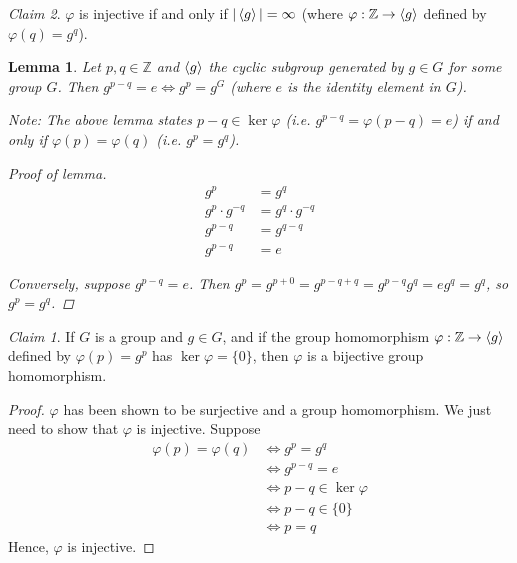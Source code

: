 \documentclass[12pt,letterpaper,DIV=11,final]{scrartcl}
\theoremstyle{plain}
\newtheorem{lemma}[theorem]{Lemma}
\theoremstyle{definition}
\theoremstyle{remark}
\newtheorem{claim}{Claim}
\begin{document}
\begin{claim}
  $\varphi$ is injective if and only if $|\braket{g}| = \infty$ (where $\varphi : \mathbb{Z} \to \braket{g}$ defined by $\varphi(q) = g^q$).

  \begin{lemma}
    Let $p, q \in \mathbb{Z}$ and $\braket{g}$ the cyclic subgroup generated by $g \in G$ for some group $G$.
    Then $g^{p - q} = e \iff g^p = g^G$ (where $e$ is the identity element in $G$).

    Note: The above lemma states $p - q \in \ker \varphi$ (i.e. $g^{p - q} = \varphi(p - q) = e$) if and only if $\varphi(p) = \varphi(q)$ (i.e. $g^p = g^q$).

    \begin{proof}[Proof of lemma]
      \begin{align*}
        g^p              &= g^q \\
        g^p \cdot g^{-q} &= g^q \cdot g^{-q} \\
        g^{p - q}        &= g^{q - q} \\
        g^{p - q}        &= e
      \end{align*}

      Conversely, suppose $g^{p - q} = e$.
      Then $g^p = g^{p + 0} = g^{p - q + q} = g^{p - q} g^q = e g^q = g^q$, so $g^p = g^q$.
    \end{proof}
  \end{lemma}

  \begin{claim}
    If $G$ is a group and $g \in G$, and if the group homomorphism $\varphi : \mathbb{Z} \to \braket{g}$ defined by $\varphi(p) = g^p$ has $\ker \varphi = \{ 0 \}$,
    then $\varphi$ is a bijective group homomorphism.

    \begin{proof}
      $\varphi$ has been shown to be surjective and a group homomorphism.
      We just need to show that $\varphi$ is injective.
      Suppose \begin{align*}
        \varphi(p) = \varphi(q) &\iff g^p = g^q \\
                                &\iff g^{p - q} = e \\
                                &\iff p - q \in \ker \varphi \\
                                &\iff p - q \in \{ 0 \} \\
                                &\iff p = q
      \end{align*}
      Hence, $\varphi$ is injective.
    \end{proof}
  \end{claim}


\end{claim}
\end{document}
